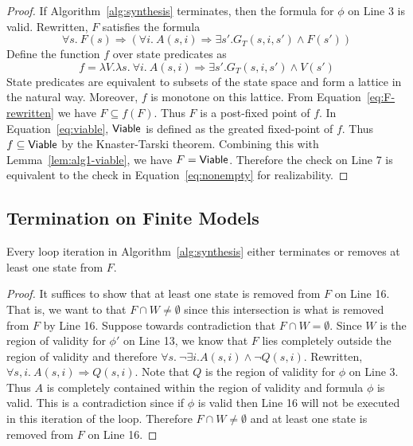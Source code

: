 \begin{proof}
If Algorithm~\ref{alg:synthesis} terminates, then the
formula for $\phi$ on Line 3 is valid. Rewritten, $F$
satisfies the formula
\begin{equation}
  \forall s.~F(s) \Rightarrow \left(\forall i.~ A(s,i) \Rightarrow \exists
    s'.G_{T}(s,i,s') \land F(s')\right)
  \label{eq:F-rewritten}
\end{equation}
Define the function $f$ over state predicates as
  \begin{equation}
    f = \lambda V. \lambda s.~ \forall i.~ A(s,i) \Rightarrow \exists s'.G_{T}(s,i,s') \land V(s')
    \label{eq:f-fixed-point}
  \end{equation}
  State predicates are equivalent to subsets of the state space and
  form a lattice in the natural way. Moreover, $f$ is monotone on this
  lattice. From Equation~\ref{eq:F-rewritten} we have
  $F \subseteq f(F)$. Thus $F$ is a post-fixed point of $f$. In
  Equation~\ref{eq:viable}, ${\mathsf {Viable}}$ is defined as the greated
  fixed-point of $f$. Thus $f \subseteq {\mathsf {Viable}}$ by the Knaster-Tarski
  theorem. Combining this with Lemma~\ref{lem:alg1-viable}, we have
  $F = {\mathsf {Viable}}$. Therefore the check on Line 7 is equivalent to the
  check in Equation~\ref{eq:nonempty} for realizability.
\end{proof}

\subsection{Termination on Finite Models}

\begin{lemma}
Every loop iteration in Algorithm~\ref{alg:synthesis} either
terminates or removes at least one state from $F$.
\label{lem:progress}
\end{lemma}
\begin{proof}
  It suffices to show that at least one state is removed from $F$ on
  Line 16. That is, we want to that $F \cap W \neq \emptyset$ since
  this intersection is what is removed from $F$ by Line 16. Suppose
  towards contradiction that $F \cap W = \emptyset$. Since $W$ is the
  region of validity for $\phi'$ on Line 13, we know that $F$ lies
  completely outside the region of validity and therefore
  $\forall s.~ \neg \exists i. A(s,i) \land \neg Q(s, i)$. Rewritten,
  $\forall s, i.~ A(s, i) \Rightarrow Q(s, i)$. Note that $Q$ is the
  region of validity for $\phi$ on Line 3. Thus $A$ is completely
  contained within the region of validity and formula $\phi$ is valid.
  This is a contradiction since if $\phi$ is valid then Line 16 will
  not be executed in this iteration of the loop. Therefore $F \cap W
  \neq \emptyset$ and at least one state is removed from $F$ on Line 16.
\end{proof}

